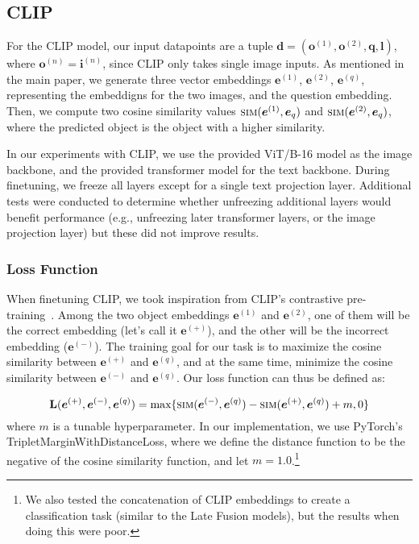 \documentclass[runningheads]{llncs}
\begin{document}
\subsection{CLIP~\cite{radford2021clip}}

For the CLIP model, our input datapoints are a tuple $\boldsymbol{d} = (\boldsymbol{o}^{(1)}, \boldsymbol{o}^{(2)}, \boldsymbol{q}, \boldsymbol{l})$, where $\boldsymbol{o}^{(n)} = \boldsymbol{i}^{(n)}$, since CLIP only takes single image inputs. As mentioned in the main paper, we generate three vector embeddings $\boldsymbol{e}^{(1)}$, $\boldsymbol{e}^{(2)}$, $\boldsymbol{e}^{(q)}$, representing the embeddigns for the two images, and the question embedding. Then, we compute two cosine similarity values $\textsc{sim} (\boldsymbol{e}^{(1)}, \boldsymbol{e}_{q})$ and $\textsc{sim} (\boldsymbol{e}^{(2)}, \boldsymbol{e}_{q})$, where the predicted object is the object with a higher similarity.

In our experiments with CLIP, we use the provided ViT/B-16 model as the image backbone, and the provided transformer model for the text backbone. During finetuning, we freeze all layers except for a single text projection layer. Additional tests were conducted to determine whether unfreezing additional layers would benefit performance (e.g., unfreezing later transformer layers, or the image projection layer) but these did not improve results.

\subsubsection{Loss Function} When finetuning CLIP, we took inspiration from CLIP's contrastive pre-training~\cite{radford2021clip}. Among the two object embeddings $\boldsymbol{e}^{(1)}$ and $\boldsymbol{e}^{(2)}$, one of them will be the correct embedding (let's call it $\boldsymbol{e}^{(+)}$), and the other will be the incorrect embedding ($\boldsymbol{e}^{(-)}$). The training goal for our task is to maximize the cosine similarity between $\boldsymbol{e}^{(+)}$ and $\boldsymbol{e}^{(q)}$, and at the same time, minimize the cosine similarity between $\boldsymbol{e}^{(-)}$ and $\boldsymbol{e}^{(q)}$. Our loss function can thus be defined as:

\begin{equation}
    \mathbf{L}(\boldsymbol{e}^{(+)}, \boldsymbol{e}^{(-)},\boldsymbol{e}^{(q)}) = \text{max}\{\textsc{sim}(\boldsymbol{e}^{(-)}, \boldsymbol{e}^{(q)}) - \textsc{sim}(\boldsymbol{e}^{(+)}, \boldsymbol{e}^{(q)}) + m, 0\}
\end{equation}
where $m$ is a tunable hyperparameter. In our implementation, we use PyTorch's TripletMarginWithDistanceLoss, where we define the distance function to be the negative of the cosine similarity function, and let $m=1.0$.\footnote{We also tested the concatenation of CLIP embeddings to create a classification task (similar to the Late Fusion models), but the results when doing this were poor.}
\end{document}
